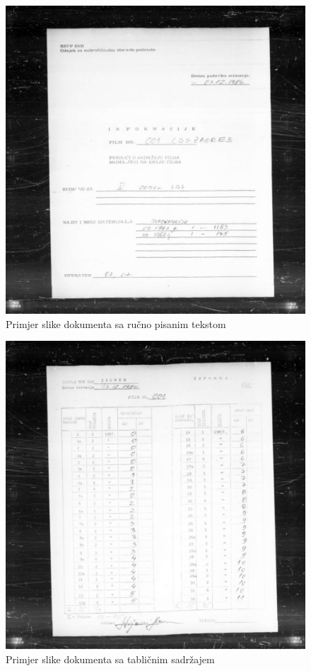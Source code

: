 \documentclass[times, utf8, zavrsni, numeric]{fer}
\begin{document}
\begin{figure}[H]
        \centering
	\includegraphics[scale=0.96]{images/opis/Z05353367.jpg}
	\caption{Primjer slike dokumenta sa ručno pisanim tekstom}
	\label{fig:binary_example}
\end{figure}
\begin{figure}[H]
        \centering
	\includegraphics[scale=0.96]{images/opis/Z05353368.jpg}
	\caption{Primjer slike dokumenta sa tabličnim sadržajem}
	\label{fig:binary_example}
\end{figure}
\end{document}
